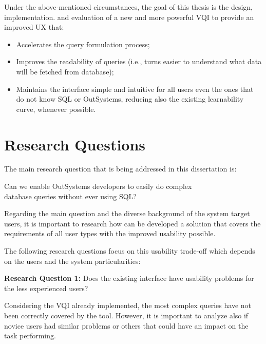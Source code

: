 Under the above-mentioned circumstances, the goal of this thesis is the design, implementation. and evaluation of a new and more powerful \gls{VQI} to provide an improved \gls{UX} that: 

\begin{itemize}
  \item Accelerates the query formulation process;
  \item Improves the readability of queries (i.e., turns easier to understand what data will be fetched from database);
  \item Maintains the interface simple and intuitive for all users even the ones that do not know SQL or OutSystems, reducing also the existing learnability curve, whenever possible.
\end{itemize}


\section{Research Questions}
\label{sec:research_questions}
The main research question that is being addressed in this dissertation is: 

\begin{center}
  Can we enable OutSystems developers to easily do complex \\ database queries without ever using \gls{SQL}?
\end{center}

Regarding the main question and the diverse background of the system target users, it is important to research how can be developed a solution that covers the requirements of all user types with the improved usability possible.

The following research questions focus on this usability trade-off which depends on the users and the system particularities:

\medskip

\textbf{Research Question 1:} Does the existing interface have usability problems for the less experienced users?

\medskip

Considering the \gls{VQI} already implemented, the most complex queries have not been correctly covered by the tool. However, it is important to analyze also if novice users had similar problems or others that could have an impact on the task performing.

